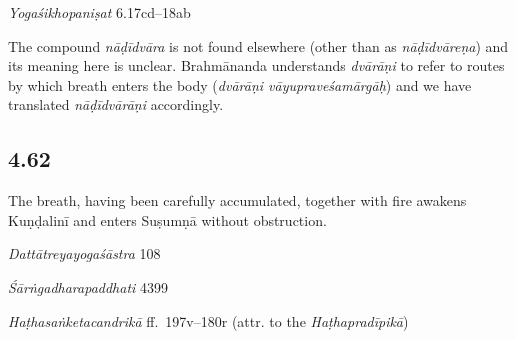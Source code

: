 \begin{ekdosis}
\begin{testimonia}[hp04_061]
\emph{Yogaśikhopaniṣat} 6.17cd–18ab
\begin{versinnote}
\end{versinnote}
\end{testimonia}

\begin{philcomm}[hp04_061]
The compound \emph{nāḍīdvāra} is not found elsewhere (other than as \emph{nāḍīdvāreṇa}) and its meaning here is unclear. Brahmānanda understands \emph{dvārāṇi} to refer to routes by which breath enters the body (\emph{dvārāṇi vāyupraveśamārgāḥ}) and we have translated \emph{nāḍīdvārāṇi} accordingly.
\end{philcomm}

\subsection*{4.62}
\begin{translation}[hp04_062]
The breath, having been carefully accumulated, together with fire awakens Kuṇḍalinī and enters Suṣumṇā without obstruction.

\end{translation}

\begin{sources}[hp04_062]
\emph{Dattātreyayogaśāstra} 108
\begin{versinnote}
\end{versinnote}
\end{sources}

\begin{testimonia}[hp04_062]
\emph{Śārṅgadharapaddhati} 4399
\begin{versinnote}
\end{versinnote}

\emph{Haṭhasaṅketacandrikā} ff.~197v–180r (attr. to the \emph{Haṭhapradīpikā})
\begin{versinnote}
\end{versinnote}
\end{testimonia}


\end{ekdosis}
